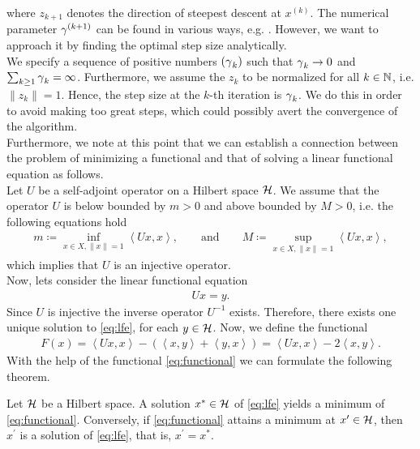 where $z_{k+1}$ denotes the direction of steepest descent at $x^{(k)}$. The numerical parameter $\operatorname{\gamma}^{(k+1)}$ can be found in various ways, e.g. \cite[Chapter~XV]{kantorovich2016functional}. However, we want to approach it by finding the optimal step size analytically.\\
We specify a sequence of positive numbers $(\operatorname{\gamma}_k)$ such that $\operatorname{\gamma}_k \to 0$ and $\sum_{k\geq 1} \operatorname{\gamma}_k = \infty$. Furthermore, we assume the $z_k$ to be normalized for all $k\in \operatorname{\mathbb{N}}$, i.e. $\|z_k\| = 1$. Hence, the step size at the $k$-th iteration is $\operatorname{\gamma}_k$. We do this in order to avoid making too great steps, which could possibly avert the convergence of the algorithm.\\
Furthermore, we note at this point that we can establish a connection between the problem of minimizing a functional and that of solving a linear functional equation as follows.\\
Let $U$ be a self-adjoint operator on a Hilbert space $\mathcal{H}$. We assume that the operator $U$ is below bounded by $m>0$ and above bounded by $M>0$, i.e. the following equations hold
\begin{align*}
m \coloneqq \inf_{x\in X, \|x\| = 1} \left\langle Ux, x \right\rangle, \qquad \text{and} \qquad M \coloneqq \sup_{x\in X, \|x\| = 1} \left\langle Ux, x \right\rangle,
\end{align*}
which implies that $U$ is an injective operator.\\
Now, lets consider the linear functional equation
\begin{align}\label{eq:lfe}
Ux = y.
\end{align}
Since $U$ is injective the inverse operator $U^{-1}$ exists. Therefore, there exists one unique solution to \eqref{eq:lfe}, for each $y\in\mathcal{H}$. Now, we define the functional
\begin{align}\label{eq:functional}
F(x) = \left\langle Ux, x\right\rangle - \left( \left\langle x, y\right\rangle + \left\langle y, x\right\rangle \right) = \left\langle Ux, x\right\rangle - 2 \left\langle x, y\right\rangle.
\end{align}
With the help of the functional \eqref{eq:functional} we can formulate the following theorem.

\begin{theorem}\label{theorem:min_lfe}
Let $\mathcal{H}$ be a Hilbert space. A solution $x^{\ast}\in \mathcal{H}$ of \eqref{eq:lfe} yields a minimum of \eqref{eq:functional}. Conversely, if \eqref{eq:functional} attains a minimum at $x^{\prime} \in \mathcal{H}$, then $x^{\prime}$ is a solution of \eqref{eq:lfe}, that is, $x^{\prime} = x^{\ast}$.
\end{theorem}

